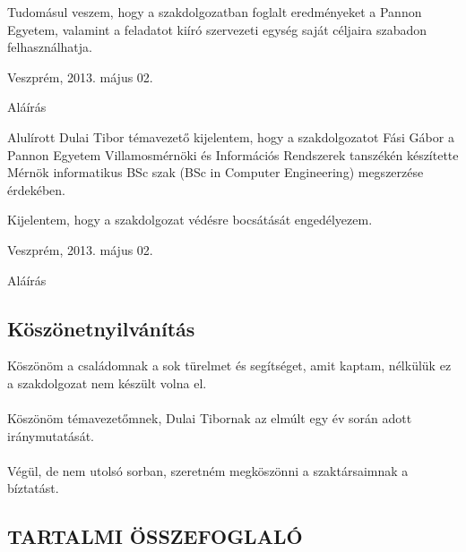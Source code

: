 \documentclass[a4paper,12pt,oneside]{report}
\begin{document}
Tudomásul veszem, hogy a szakdolgozatban foglalt eredményeket a Pannon Egyetem, valamint a feladatot kiíró szervezeti egység saját céljaira szabadon felhasználhatja.\\

\begin{flushleft}
{Veszprém, 2013. május 02.\\}
\end{flushleft}

\begin{flushright}
{Aláírás \vspace{4cm}}
\end{flushright}

Alulírott Dulai Tibor témavezető kijelentem, hogy a szakdolgozatot Fási Gábor a Pannon Egyetem Villamosmérnöki és Információs Rendszerek tanszékén készítette Mérnök informatikus BSc szak (BSc in Computer Engineering) megszerzése érdekében.

Kijelentem, hogy a szakdolgozat védésre bocsátását engedélyezem.\\

\begin{flushleft}
{Veszprém, 2013. május 02.\\}
\end{flushleft}

\begin{flushright}
{Aláírás}
\end{flushright}
\newpage
\pagebreak
\begin{center}
\section*{Köszönetnyilvánítás}
\end{center}

Köszönöm a családomnak a sok türelmet és segítséget, amit kaptam, nélkülük ez a szakdolgozat nem készült volna el.
\\
\\
Köszönöm témavezetőmnek, Dulai Tibornak az elmúlt egy év során adott iránymutatását.
\\
\\
Végül, de nem utolsó sorban, szeretném megköszönni a szaktársaimnak a bíztatást.

\newpage

\begin{center}
\section*{\textbf{\Large \MakeUppercase{Tartalmi összefoglaló}}}
\end{center}
\end{document}
